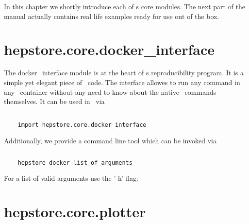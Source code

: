 
In this chapter we shortly introduce each of \hepstore s core
modules. The next part of the manual actually contains real life
examples ready for use out of the box. 

\section{hepstore.core.docker\_interface}

The docker\_interface module is at the heart of \hepstore s
reproducibility program. It is a simple yet elegant piece of
\python~code. The interface allowes to run any command in any
\docker~container without any need to know about the native
\docker~commands themselves. It can be used in \python~via
%
\begin{changemargin}{1.5cm}{1.5cm}
  \centering
  \begin{lstlisting}
    
    import hepstore.core.docker_interface
  \end{lstlisting}
\end{changemargin}
%
Additionally, we provide a command line tool which can be invoked via
%
\begin{changemargin}{1.5cm}{1.5cm}
  \centering
  \begin{lstlisting}[language=Bash]
    
    hepstore-docker list_of_arguments
  \end{lstlisting}
\end{changemargin}
%
For a list of valid arguments use the '-h' flag.

\section{hepstore.core.plotter}

